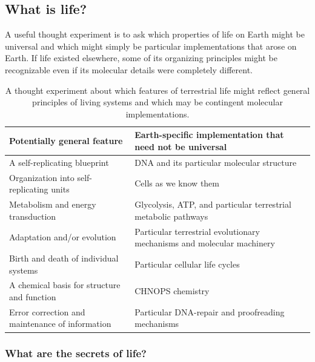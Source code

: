 \subsection{What is life?}

A useful thought experiment is to ask which properties of life on Earth might be universal and which might simply be particular implementations that arose on Earth.
If life existed elsewhere, some of its organizing principles might be recognizable even if its molecular details were completely different.

\begin{table}[h!]
\centering
\renewcommand{\arraystretch}{1.4}
\begin{tabularx}{0.9\textwidth}{
    |>{\raggedright\arraybackslash}X
    |>{\raggedright\arraybackslash}X|
}
\hline
\textbf{Potentially general feature} & \textbf{Earth-specific implementation that need not be universal}
\\
\hline
A self-replicating blueprint & DNA and its particular molecular structure
\\
\hline
Organization into self-replicating units & Cells as we know them
\\
\hline
Metabolism and energy transduction & Glycolysis, ATP, and particular terrestrial metabolic pathways
\\
\hline
Adaptation and/or evolution & Particular terrestrial evolutionary mechanisms and molecular machinery
\\
\hline
Birth and death of individual systems & Particular cellular life cycles
\\
\hline
A chemical basis for structure and function & CHNOPS chemistry
\\
\hline
Error correction and maintenance of information & Particular DNA-repair and proofreading mechanisms
\\
\hline
\end{tabularx}
\caption{A thought experiment about which features of terrestrial life might reflect general principles of living systems and which may be contingent molecular implementations.}
\end{table}


\subsubsection{What are the secrets of life?}

